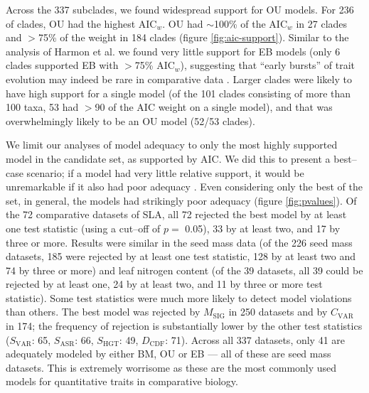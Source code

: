 \documentclass[a4paper,11pt]{article}
\begin{document}
Across the 337 subclades, we found widespread support for OU
models. For 236 of clades, OU had the highest AIC$_w$.
OU had $\sim$100\% of the AIC$_w$ in 27 clades and $>$75\% of the weight in 184 clades (figure \ref{fig:aic-support}). Similar to the analysis of Harmon et al. \citep{Harmon2010} we found very little support for EB models (only 6 clades supported EB with $>$75\% AIC$_w$), suggesting that ``early bursts'' of trait evolution may indeed be rare in comparative data \citep[but see][]{SlaterPennell}. Larger clades were
likely to have high support for a single model (of the 101 clades consisting of more than 100 taxa, 53 had $>$90 of the AIC weight on a single model),
and that was overwhelmingly likely to be an OU model (52/53 clades). 

We limit our analyses of model adequacy to only the most highly supported model in the candidate set, as supported by AIC. We did this to present a best--case scenario; if a model had very little relative support, it would be unremarkable if it also had poor adequacy \citep[but see][]{Ripplinger2010}. Even considering only the best of the set, in general, the models had strikingly poor adequacy (figure \ref{fig:pvalues}). 
Of the 72 comparative datasets of SLA, all 72 rejected the best model by at least one test statistic (using a cut--off of $p=$ 0.05), 33 by at least two, and 17 by three or more. 
Results were similar in the seed mass data (of the 226 seed mass datasets, 185 were rejected by at least one test statistic, 128 by at least two and 74 by three or more) and leaf nitrogen content 
(of the 39 datasets, all 39 could be rejected by at least one, 24 by at least two, and 11 by three or more test statistic). 
Some test statistics were much more likely to detect model violations than others. The best model was rejected by $M_{\text{SIG}}$ in 250 datasets and by $C_{\text{VAR}}$ in 174; the frequency of rejection is substantially lower by the other test statistics ($S_{\text{VAR}}$: 65, $S_{\text{ASR}}$: 66, $S_{\text{HGT}}$: 49, $D_{\text{CDF}}$: 71).
Across all 337 datasets, only 41 are adequately modeled by either BM, OU or EB --- all of these are seed mass datasets. This is extremely worrisome as these are the most commonly used models for quantitative traits in comparative biology. 
\end{document}
